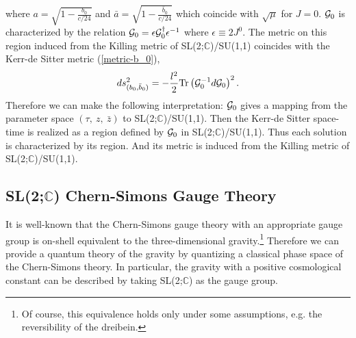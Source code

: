 \documentclass[a4paper,11pt]{article}
\begin{document}
where $a=\sqrt{1-\frac{b_0}{c/24}}$ and 
$\bar{a}=\sqrt{1-\frac{\bar{b}_0}{c/24}}$ which coincide with 
$\sqrt{\mu}$ for $J=0$.
${\cal G}_0$ is characterized by the relation 
${\cal G}_0=\epsilon {\cal G}_0^\dagger\epsilon^{-1}$ 
where $\epsilon\equiv2J^0$.
The metric on this region induced from the Killing metric of 
SL(2;$\mathbb{C}$)/SU(1,1) coincides with the Kerr-de Sitter metric 
(\ref{metric-b_0}),
\begin{equation}
ds^2_{(b_0, \bar{b}_0)}=
  -\frac{l^2}{2}\mbox{Tr}\left({\cal G}_0^{-1}d{\cal G}_0\right)^2.
\end{equation}
Therefore we can make the following interpretation: 
${\cal G}_0$ gives a mapping from the parameter space 
$(\tau, \ z, \ \bar{z})$ to SL(2;$\mathbb{C}$)/SU(1,1).
Then the Kerr-de Sitter space-time is realized as a region 
defined by ${\cal G}_0$ in SL(2;$\mathbb{C}$)/SU(1,1). 
Thus each solution is characterized by its region.
And its metric is induced from the Killing metric of 
SL(2;$\mathbb{C}$)/SU(1,1).


\subsection{SL(2;$\mathbb{C}$) Chern-Simons Gauge Theory}
It is well-known that the Chern-Simons gauge theory with an appropriate 
gauge group is on-shell equivalent to the three-dimensional
gravity\cite{Townsend, Witten2}.\footnote{
Of course, this equivalence holds only under some assumptions, 
e.g. the reversibility of the dreibein.
} 
Therefore we can provide a quantum theory of the gravity by quantizing 
a classical phase space of the Chern-Simons theory.
In particular, the gravity with a positive cosmological constant 
can be described by taking SL(2;$\mathbb{C}$) as the gauge group.
\end{document}
